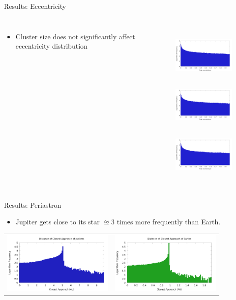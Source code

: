 \documentclass{beamer}
\begin{document}
\begin{frame}{Results: Eccentricity}
    \begin{columns}
        \begin{itemize}
            \item Cluster size does not significantly affect eccentricity distribution
        \end{itemize}
        \begin{figure}
            \includegraphics[height=1.00in]{eccentricity_jupiter_1000.png} \\
            \includegraphics[height=1.00in]{eccentricity_jupiter_2000.png} \\
            \includegraphics[height=1.00in]{eccentricity_jupiter_4000.png}
        \end{figure}
    \end{columns}
\end{frame}

\begin{frame}{Results: Periastron}
    \begin{itemize}
        \item Jupiter gets close to its star $\approxeq 3$ times more frequently than Earth.
    \end{itemize}
    \begin{tabular}{cc}
        \includegraphics[height=1.20in]{periastron_jupiter_1000.png} &
        \includegraphics[height=1.20in]{periastron_earth_1000.png}
    \end{tabular}
\end{frame}
\end{document}
